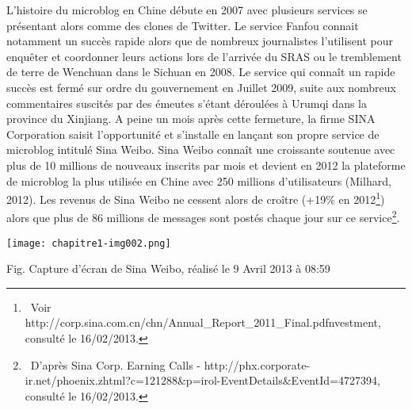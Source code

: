 {\color{black}
L'histoire du microblog en Chine d\'ebute en 2007 avec plusieurs services se pr\'esentant alors comme des clones de
Twitter. Le service Fanfou connait notamment un succ\`es rapide alors que de nombreux journalistes l'utilisent pour
enqu\^eter et coordonner leurs actions lors de l'arriv\'ee du SRAS ou le tremblement de terre de Wenchuan dans le
Sichuan en 2008. Le service qui conna\^it un rapide succ\`es est ferm\'e sur ordre du gouvernement en Juillet 2009,
suite aux nombreux commentaires suscit\'es par des \'emeutes s'\'etant d\'eroul\'ees \`a Urumqi dans la province du
Xinjiang. A peine un mois apr\`es cette fermeture, la firme SINA Corporation saisit l'opportunit\'e et s'installe en
lan\c{c}ant son propre service de microblog intitul\'e Sina Weibo. Sina Weibo conna\^it une croissante soutenue avec
plus de 10 millions de nouveaux inscrits par mois et devient en 2012 la plateforme de microblog la plus utilis\'ee en
Chine avec 250 millions d'utilisateurs (Milhard, 2012). Les revenus de Sina Weibo ne cessent alors de cro\^itre (+19\%
en 2012\footnote{\ Voir http://corp.sina.com.cn/chn/Annual\_Report\_2011\_Final.pdfnvestment, consult\'e le
16/02/2013.}) alors que plus de 86 millions de messages sont post\'es chaque jour sur ce service\footnote{\ D'apr\`es
Sina Corp. Earning Calls - http://phx.corporate-ir.net/phoenix.zhtml?c=121288\&p=irol-EventDetails\&EventId=4727394,
consult\'e le 16/02/2013.}. }


\bigskip

{\centering \par}
\begin{center}
\texttt{[image: chapitre1-img002.png]}
\end{center}
{\color{black}
Fig. Capture d'\'ecran de Sina Weibo, r\'ealis\'e le 9 Avril 2013 \`a 08:59}


\bigskip

